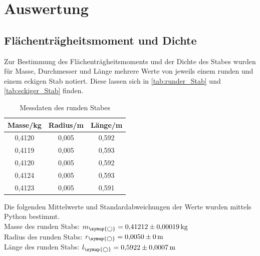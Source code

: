 \section{Auswertung}
\label{sec:Auswertung}

\subsection{Flächenträgheitsmoment und Dichte}

  Zur Bestimmung des Flächenträgheitsmoments und der Dichte des Stabes wurden für Masse, Durchmesser und Länge mehrere
  Werte von jeweils einem runden und einem eckigen Stab notiert. Diese lassen sich in \autoref{tab:runder_Stab} und \autoref{tab:eckiger_Stab} finden.

  \begin{table}
    \centering
    \caption{Messdaten des runden Stabes}
    \label{tab:runder_Stab}
    \begin{tabular}{c c c}
      \toprule
      Masse/kg & Radius/m & Länge/m \\
      \midrule
      0,4120 & 0,005 & 0,592 \\
      0,4119 & 0,005 & 0,593 \\
      0,4120 & 0,005 & 0,592 \\
      0,4124 & 0,005 & 0,593 \\
      0,4123 & 0,005 & 0,591 \\
      \bottomrule
    \end{tabular}
  \end{table}

  Die folgenden Mittelwerte und Standardabweichungen der Werte wurden mittels Python bestimmt.\\
  Masse des runden Stabs: $m_{\symup{\bigcirc}} = 0{,}41212 \pm 0{,}00019 \, \mathrm{kg}$\\
  Radius des runden Stabs: $r_{\symup{\bigcirc}} = 0{,}0050 \pm 0 \, \mathrm{m}$\\
  Länge des runden Stabs: $l_{\symup{\bigcirc}} = 0{,}5922 \pm 0{,}0007 \, \mathrm{m}$\\

